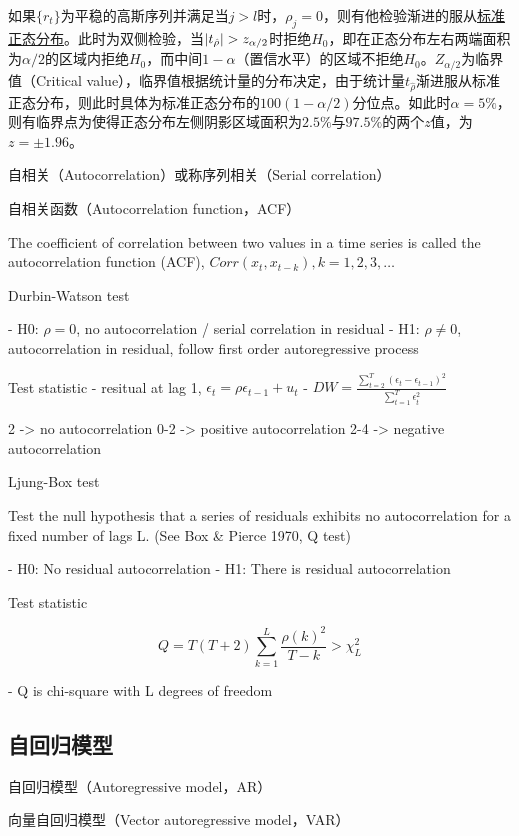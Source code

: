 \documentclass[11pt]{article}
\begin{document}
如果$\{r_t\}$为平稳的高斯序列并满足当$j>l$时，$\rho_j=0$，则有他检验渐进的服从\uline{标准正态分布}。此时为双侧检验，当$\left\lvert t_{\hat{\rho}}\right\rvert>z_{\alpha/2}$时拒绝$H_0$，即在正态分布左右两端面积为$\alpha/2$的区域内拒绝$H_0$，而中间$1-\alpha$（置信水平）的区域不拒绝$H_0$。$Z_{\alpha/2}$为临界值（Critical value），临界值根据统计量的分布决定，由于统计量$t_{\hat{\rho}}$渐进服从标准正态分布，则此时具体为标准正态分布的$100(1-\alpha/2)$分位点。如此时$\alpha=5\%$，则有临界点为使得正态分布左侧阴影区域面积为$2.5\%$与$97.5\%$的两个$z$值，为$z=\pm 1.96$。


\divider

自相关（Autocorrelation）或称序列相关（Serial correlation）


自相关函数（Autocorrelation function，ACF）

The coefficient of correlation between two values in a time series is called the autocorrelation function (ACF), $Corr(x_t, x_{t-k}), k=1,2,3,\dotsc$




Durbin-Watson test

- H0: $\rho = 0$, no autocorrelation / serial correlation in residual
- H1: $\rho \neq 0$, autocorrelation in residual, follow first order autoregressive process

Test statistic
- resitual at lag 1, $\epsilon_t = \rho \epsilon_{t-1} + u_t$
- $DW = \frac{\sum_{t=2}^{T} (\epsilon_t - \epsilon_{t-1})^2}{\sum_{t=1}^{T} \epsilon^2_t}$

2 -> no autocorrelation
0-2 -> positive autocorrelation
2-4 -> negative autocorrelation

Ljung-Box test 

Test the null hypothesis that a series of residuals exhibits no autocorrelation for a fixed number of lags L. (See Box \& Pierce 1970, Q test)

- H0: No residual autocorrelation
- H1: There is residual autocorrelation

Test statistic

$$
Q = T(T+2) \sum^L_{k=1} \frac{\rho(k)^2}{T-k} > \chi^2_L
$$

- Q is chi-square with L degrees of freedom


\subsection{自回归模型}

自回归模型（Autoregressive model，AR）

向量自回归模型（Vector autoregressive model，VAR）
    
\end{document}
